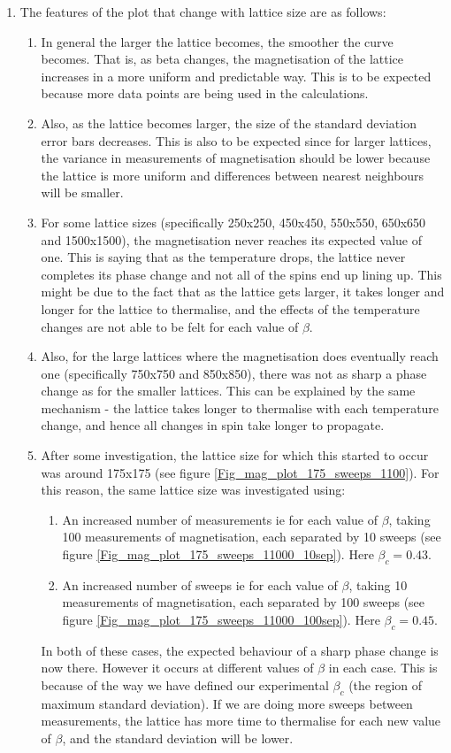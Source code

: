 \documentclass[a4paper]{article}
\begin{document}
\begin{enumerate}
	\item The features of the plot that change with lattice size are as follows:
	\begin{enumerate}
		\item In general the larger the lattice becomes, the smoother the curve becomes. That is, as beta changes, the magnetisation of the lattice increases in a more uniform and predictable way. This is to be expected because more data points are being used in the calculations.
		\item Also, as the lattice becomes larger, the size of the standard deviation error bars decreases. This is also to be expected since for larger lattices, the variance in measurements of magnetisation should be lower because the lattice is more uniform and differences between nearest neighbours will be smaller.
		\item For some lattice sizes (specifically 250x250, 450x450, 550x550, 650x650 and 1500x1500), the magnetisation never reaches its expected value of one. This is saying that as the temperature drops, the lattice never completes its phase change and not all of the spins end up lining up. This might be due to the fact that as the lattice gets larger, it takes longer and longer for the lattice to thermalise, and the effects of the temperature changes are not able to be felt for each value of $\beta$.
		\item Also, for the large lattices where the magnetisation does eventually reach one (specifically 750x750 and 850x850), there was not as sharp a phase change as for the smaller lattices. This can be explained by the same mechanism - the lattice takes longer to thermalise with each temperature change, and hence all changes in spin take longer to propagate.
		\item After some investigation, the lattice size for which this started to occur was around 175x175 (see figure \ref{Fig_mag_plot_175_sweeps_1100}). For this reason, the same lattice size was investigated using:
			\begin{enumerate}
				\item An increased number of measurements ie for each value of $\beta$, taking 100 measurements of magnetisation, each separated by 10 sweeps (see figure \ref{Fig_mag_plot_175_sweeps_11000_10sep}). Here $\beta_c=0.43$.
				\item An increased number of sweeps ie for each value of $\beta$, taking 10 measurements of magnetisation, each separated by 100 sweeps (see figure \ref{Fig_mag_plot_175_sweeps_11000_100sep}). Here $\beta_c=0.45$.
		 	\end{enumerate}
	 	In both of these cases, the expected behaviour of a sharp phase change is now there. However it occurs at different values of $\beta$ in each case. This is because of the way we have defined our experimental $\beta_c$ (the region of maximum standard deviation). If we are doing more sweeps between measurements, the lattice has more time to thermalise for each new value of $\beta$, and the standard deviation will be lower.\\
	 	

\end{enumerate}
\end{enumerate}
\end{document}
